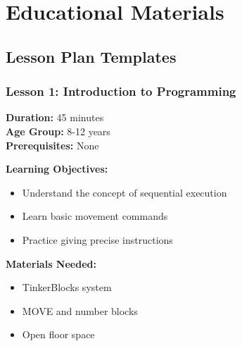 \section{Educational Materials}

\subsection{Lesson Plan Templates}

\subsubsection{Lesson 1: Introduction to Programming}

\textbf{Duration:} 45 minutes \\
\textbf{Age Group:} 8-12 years \\
\textbf{Prerequisites:} None

\textbf{Learning Objectives:}
\begin{itemize}
    \item Understand the concept of sequential execution
    \item Learn basic movement commands
    \item Practice giving precise instructions
\end{itemize}

\textbf{Materials Needed:}
\begin{itemize}
    \item TinkerBlocks system
    \item MOVE and number blocks
    \item Open floor space
\end{itemize}

